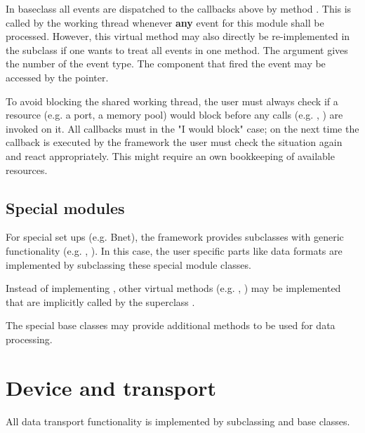 \begin{compactenum}
\begin{compactdesc}
\end{compactdesc}      
   
\item   In baseclass  all events are dispatched to the callbacks above by method 
. 
This is called by the working thread
whenever {\bf any} event for this module shall be processed.
However, this virtual method  
may also directly be re-implemented in the  subclass
if one wants to treat all events in one method. 
The  argument gives the number of the event type. 
The component that fired the event may be accessed 
by the  pointer. 

      
\item    To avoid blocking the shared working thread, 
the user must always check if a resource (e.g. a port, a memory pool) 
would block before any calls (e.g. , ) are
invoked on it. 
All callbacks must  in the "I would block" case; on the next 
time the callback is executed by the framework the user must check the
situation again and react appropriately. This might require an own
bookkeeping of available resources. 

\end{compactenum}
   

\subsection{Special modules}
For special set ups (e.g. Bnet), the framework provides 
    subclasses with generic functionality 
   (e.g. , ). 
   In this case, the user specific parts like data formats are 
   implemented by subclassing these special module classes.

   
\begin{compactenum}

\item  Instead of implementing , other virtual 
      methods (e.g. , ) may be 
      implemented that are implicitly called by the superclass .
\item  The special base classes may provide additional 
      methods to be used for data processing.    
\end{compactenum}

\section{Device and transport}
\label{prog_plugin_device}
All data transport functionality is implemented by 
   subclassing   and  base classes.
       
